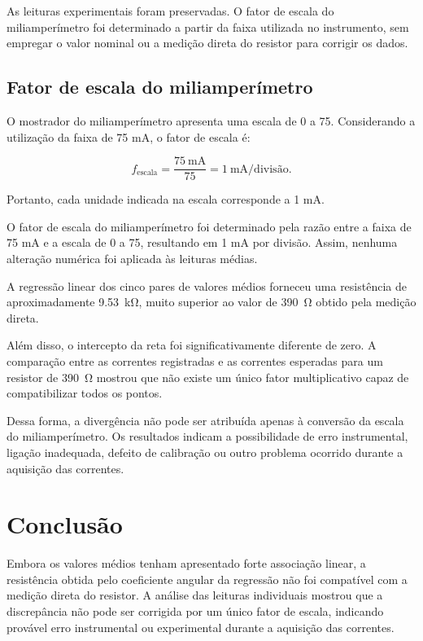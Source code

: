 \documentclass[a4paper,12pt]{article}
\begin{document}
As leituras experimentais foram preservadas. O fator de escala do miliamperímetro foi determinado a partir da faixa utilizada no instrumento, sem empregar o valor nominal ou a medição direta do resistor para corrigir os dados.

\subsection{Fator de escala do miliamperímetro}

O mostrador do miliamperímetro apresenta uma escala de 0 a 75.
Considerando a utilização da faixa de 75 mA, o fator de escala é:

\[
f_{\mathrm{escala}}
=
\frac{75\ \mathrm{mA}}{75}
=
1\ \mathrm{mA/divisão}.
\]

Portanto, cada unidade indicada na escala corresponde a 1 mA.

O fator de escala do miliamperímetro foi determinado pela razão entre
a faixa de 75 mA e a escala de 0 a 75, resultando em 1 mA por divisão.
Assim, nenhuma alteração numérica foi aplicada às leituras médias.

A regressão linear dos cinco pares de valores médios forneceu uma resistência de aproximadamente \SI{9,53}{\kilo\ohm}, muito superior ao valor de \SI{390}{\ohm} obtido pela medição direta.

Além disso, o intercepto da reta foi significativamente diferente de zero. A comparação entre as correntes registradas e as correntes esperadas para um resistor de \SI{390}{\ohm} mostrou que não existe um único fator multiplicativo capaz de compatibilizar todos os pontos.

Dessa forma, a divergência não pode ser atribuída apenas à conversão
da escala do miliamperímetro. Os resultados indicam a possibilidade de
erro instrumental, ligação inadequada, defeito de calibração ou outro
problema ocorrido durante a aquisição das correntes.

\section{Conclusão}

Embora os valores médios tenham apresentado forte associação linear, a resistência obtida pelo coeficiente angular da regressão não foi compatível com a medição direta do resistor. A análise das leituras individuais mostrou que a discrepância não pode ser corrigida por um único fator de escala, indicando provável erro instrumental ou experimental durante a aquisição das correntes. 
\end{document}
